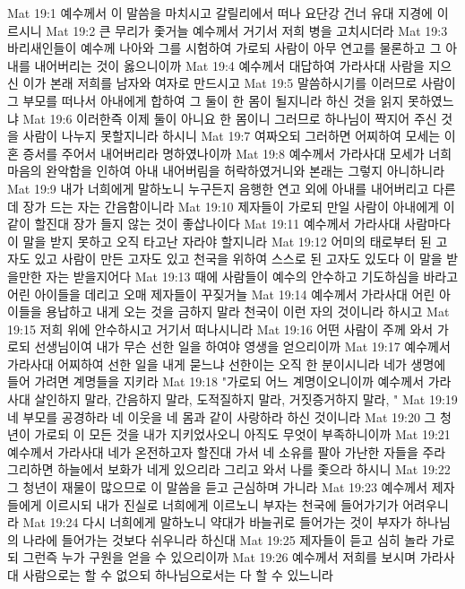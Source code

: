 Mat 19:1  예수께서 이 말씀을 마치시고 갈릴리에서 떠나 요단강 건너 유대 지경에 이르시니
Mat 19:2  큰 무리가 좇거늘 예수께서 거기서 저희 병을 고치시더라
Mat 19:3  바리새인들이 예수께 나아와 그를 시험하여 가로되 사람이 아무 연고를 물론하고 그 아내를 내어버리는 것이 옳으니이까
Mat 19:4  예수께서 대답하여 가라사대 사람을 지으신 이가 본래 저희를 남자와 여자로 만드시고
Mat 19:5  말씀하시기를 이러므로 사람이 그 부모를 떠나서 아내에게 합하여 그 둘이 한 몸이 될지니라 하신 것을 읽지 못하였느냐
Mat 19:6  이러한즉 이제 둘이 아니요 한 몸이니 그러므로 하나님이 짝지어 주신 것을 사람이 나누지 못할지니라 하시니
Mat 19:7  여짜오되 그러하면 어찌하여 모세는 이혼 증서를 주어서 내어버리라 명하였나이까
Mat 19:8  예수께서 가라사대 모세가 너희 마음의 완악함을 인하여 아내 내어버림을 허락하였거니와 본래는 그렇지 아니하니라
Mat 19:9  내가 너희에게 말하노니 누구든지 음행한 연고 외에 아내를 내어버리고 다른데 장가 드는 자는 간음함이니라
Mat 19:10  제자들이 가로되 만일 사람이 아내에게 이같이 할진대 장가 들지 않는 것이 좋삽나이다
Mat 19:11  예수께서 가라사대 사람마다 이 말을 받지 못하고 오직 타고난 자라야 할지니라
Mat 19:12  어미의 태로부터 된 고자도 있고 사람이 만든 고자도 있고 천국을 위하여 스스로 된 고자도 있도다 이 말을 받을만한 자는 받을지어다
Mat 19:13  때에 사람들이 예수의 안수하고 기도하심을 바라고 어린 아이들을 데리고 오매 제자들이 꾸짖거늘
Mat 19:14  예수께서 가라사대 어린 아이들을 용납하고 내게 오는 것을 금하지 말라 천국이 이런 자의 것이니라 하시고
Mat 19:15  저희 위에 안수하시고 거기서 떠나시니라
Mat 19:16  어떤 사람이 주께 와서 가로되 선생님이여 내가 무슨 선한 일을 하여야 영생을 얻으리이까
Mat 19:17  예수께서 가라사대 어찌하여 선한 일을 내게 묻느냐 선한이는 오직 한 분이시니라 네가 생명에 들어 가려면 계명들을 지키라
Mat 19:18  "가로되 어느 계명이오니이까 예수께서 가라사대 살인하지 말라, 간음하지 말라, 도적질하지 말라, 거짓증거하지 말라, "
Mat 19:19  네 부모를 공경하라 네 이웃을 네 몸과 같이 사랑하라 하신 것이니라
Mat 19:20  그 청년이 가로되 이 모든 것을 내가 지키었사오니 아직도 무엇이 부족하니이까
Mat 19:21  예수께서 가라사대 네가 온전하고자 할진대 가서 네 소유를 팔아 가난한 자들을 주라 그리하면 하늘에서 보화가 네게 있으리라 그리고 와서 나를 좇으라 하시니
Mat 19:22  그 청년이 재물이 많으므로 이 말씀을 듣고 근심하며 가니라
Mat 19:23  예수께서 제자들에게 이르시되 내가 진실로 너희에게 이르노니 부자는 천국에 들어가기가 어려우니라
Mat 19:24  다시 너희에게 말하노니 약대가 바늘귀로 들어가는 것이 부자가 하나님의 나라에 들어가는 것보다 쉬우니라 하신대
Mat 19:25  제자들이 듣고 심히 놀라 가로되 그런즉 누가 구원을 얻을 수 있으리이까
Mat 19:26  예수께서 저희를 보시며 가라사대 사람으로는 할 수 없으되 하나님으로서는 다 할 수 있느니라
